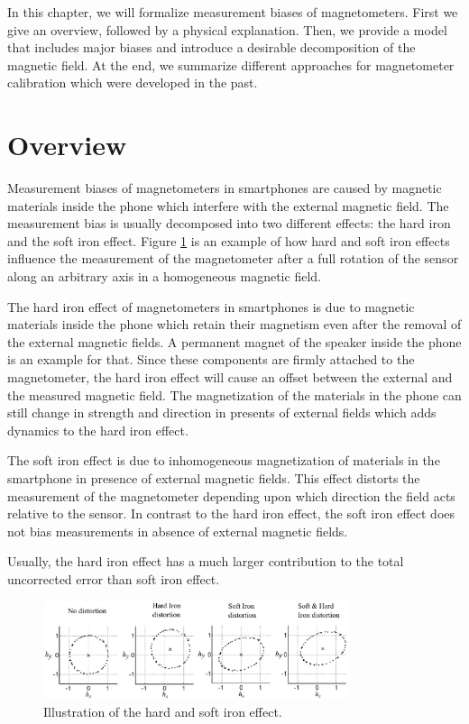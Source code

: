 In this chapter, we will formalize measurement biases of magnetometers. First we give an overview, followed by a physical explanation. Then, we provide a model that includes major biases and introduce a desirable decomposition of the magnetic field. At the end, we summarize different approaches for magnetometer calibration which were developed in the past.

\section{Overview}

Measurement biases of magnetometers in smartphones are caused by magnetic materials inside the phone which interfere with the external magnetic field. The measurement bias is usually decomposed into two different effects: the hard iron and the soft iron effect. Figure \ref{fig:hard_soft_iron} is an example of how hard and soft iron effects influence the measurement of the magnetometer after a full rotation of the sensor along an arbitrary axis in a homogeneous magnetic field.

The hard iron effect of magnetometers in smartphones is due to magnetic materials inside the phone which retain their magnetism even after the removal of the external magnetic fields. A permanent magnet of the speaker inside the phone is an example for that. Since these components are firmly attached to the magnetometer, the hard iron effect will cause an offset between the external and the measured magnetic field. The magnetization of the materials in the phone can still change in strength and direction in presents of external fields which adds dynamics to the hard iron effect.

The soft iron effect is due to inhomogeneous magnetization of materials in the smartphone in presence of external magnetic fields. This effect distorts the measurement of the magnetometer depending upon which direction the field acts relative to the sensor. In contrast to the hard iron effect, the soft iron effect does not bias measurements in absence of external magnetic fields.

Usually, the hard iron effect has a much larger contribution to the total uncorrected error than soft iron effect.\cite{vectornav}

\begin{figure}[hbt!]
    \centering
    \includegraphics[width=0.8\textwidth]{figures/hard_soft_iron.jpg}
    \caption{Illustration of the hard and soft iron effect.\cite{hard_soft_iron}}
    \label{fig:hard_soft_iron}
\end{figure}

